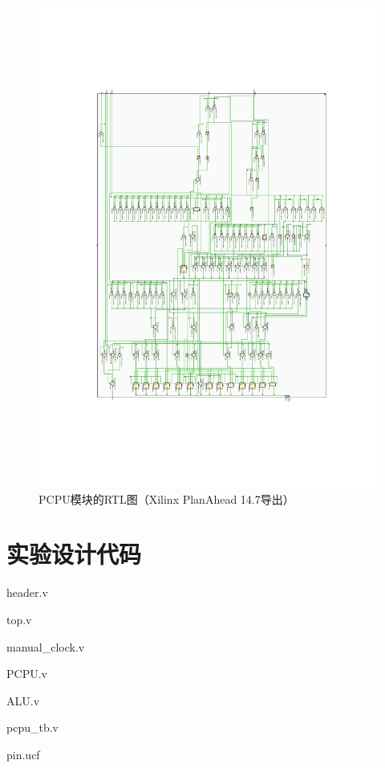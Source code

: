 \documentclass[10pt,a4paper,fleqn]{article}
\begin{document}
\begin{figure}[H]
  \hspace{-2cm}
  \includegraphics[width=1.2\textwidth]{figure/pcpuex.pdf}
  \caption{PCPU模块的RTL图（Xilinx PlanAhead 14.7导出）}
\end{figure}
\newpage
\section{实验设计代码}
header.v

\par top.v

\par manual\_clock.v

\par PCPU.v

\par ALU.v

\par pcpu\_tb.v

\par pin.ucf

\end{document}
